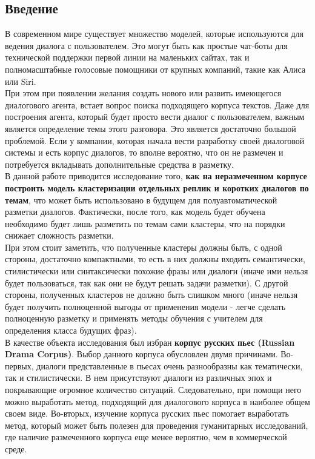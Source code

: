 \documentclass[a4paper,14pt]{article}
\begin{document}
\begin{center} 
	\section*{Введение} 
\end{center}
\begin{justify}
В современном мире существует множество моделей, которые используются для ведения диалога с пользователем. Это могут быть как простые чат-боты для технической поддержки первой линии на маленьких сайтах, так и полномасштабные голосовые помощники от крупных компаний, такие как Алиса или Siri. \\
\indent 
При этом при появлении желания создать нового или развить имеющегося диалогового агента, встает вопрос поиска подходящего корпуса текстов. Даже для построения агента, который будет просто вести диалог с пользователем, важным является определение темы этого разговора. Это является достаточно большой проблемой. Если у компании, которая начала вести разработку своей диалоговой системы и есть корпус диалогов, то вполне вероятно, что он не размечен и потребуется вкладывать дополнительные средства в разметку.\\
\indent 
В данной работе приводится исследование того, \textbf{как на неразмеченном корпусе построить модель кластеризации отдельных реплик и коротких диалогов по темам}, что может быть использовано в будущем для полуавтоматической разметки диалогов. Фактически, после того, как модель будет обучена необходимо будет лишь разметить по темам сами кластеры, что на порядки снижает сложность разметки. \\
\indent 
При этом стоит заметить, что полученные кластеры должны быть, с одной стороны, достаточно компактными, то есть в них должны входить семантически, стилистически или синтаксически похожие фразы или диалоги (иначе ими нельзя будет пользоваться, так как они не будут решать задачи разметки). С другой стороны, полученных кластеров не должно быть слишком много (иначе нельзя будет получить полноценной выгоды от применения модели - легче сделать полноценную разметку и применять методы обучения с учителем для определения класса будущих фраз). \\
\indent
В качестве объекта исследования был избран \textbf{корпус русских пьес (Russian Drama Corpus)}\cite{dracor}. Выбор данного корпуса обусловлен двумя причинами. Во-первых, диалоги представленные в пьесах очень разнообразны как тематически, так и стилистически. В нем присутствуют диалоги из различных эпох и покрывающие огромное количество ситуаций. Следовательно, при помощи него можно выработать метод, подходящий для диалогового корпуса в наиболее общем своем виде. Во-вторых, изучение корпуса русских пьес помогает выработать метод, который может быть полезен для проведения гуманитарных исследований, где наличие размеченного корпуса еще менее вероятно, чем в коммерческой среде. \\

\end{justify}
\end{document}
